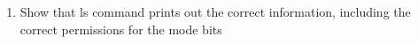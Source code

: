 \documentclass[11pt,letterpaper]{report}
\begin{document}
\begin{enumerate}
\begin{figure}[h!]
                                                                                                                                                                                                                                                                                                                                                                                                                                                                                                                                                                                                                                                                                                                            \end{figure}

                                                                                                                                                                                                                                                                                                                                                                                                                                                                                                                                                                                                                                                                                                                            \newpage

                                                                                                                                                                                                                                                                                                                                                                                                                                                                                                                                                                                                                                                                                                                                \item Show that ls command prints out the correct information, including the correct permissions for the
                                                                                                                                                                                                                                                                                                                                                                                                                                                                                                                                                                                                                                                                                                                                mode bits


\end{enumerate}
\end{document}
